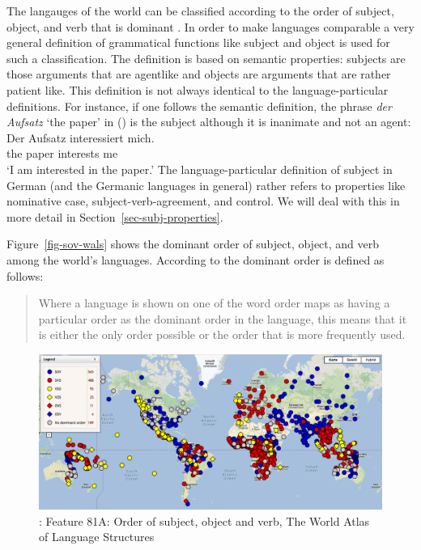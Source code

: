 The langauges of the world can be classified according to the order of subject, object, and verb
that is dominant \citep{Greenberg63a-u}. In order to make languages comparable a very general definition of grammatical
functions like subject and object is used
for such a classification. The definition is based on semantic properties: subjects are those
arguments that are agentlike and objects are arguments that are rather patient like. This definition
is not always identical to the language-particular definitions. For instance, if one follows the
semantic definition, the phrase \emph{der
  Aufsatz} `the paper' in () is the subject although it is inanimate and not an agent: 
\ea
\gll Der Aufsatz interessiert mich.\\
     the paper   interests    me\\
\glt `I am interested in the paper.'
\z
The language-particular definition of subject in German (and the Germanic languages in general)
rather refers to properties like nominative case, subject-verb-agreement, and control. We will deal with this in more
detail in Section~\ref{sec-subj-properties}.

Figure~\vref{fig-sov-wals} shows the dominant order of subject, object, and verb among the world's languages.
According to \citet{Dryer2013a} the dominant order is defined as follows:

\begin{quote}
Where a language is shown on one of the word order maps as having a particular order as the dominant
order in the language, this means that it is either the only order possible or the order
that is more frequently used. \citep{Dryer2013a}
\end{quote}
%
%
%
\begin{figure}
\includegraphics[width=\textwidth]{Pictures/WALS-SOV}
\caption{\label{fig-sov-wals}\citet[Section~1]{Dryer2013c}: Feature 81A: Order of subject, object and verb, The World Atlas of Language Structures} 
\end{figure}

